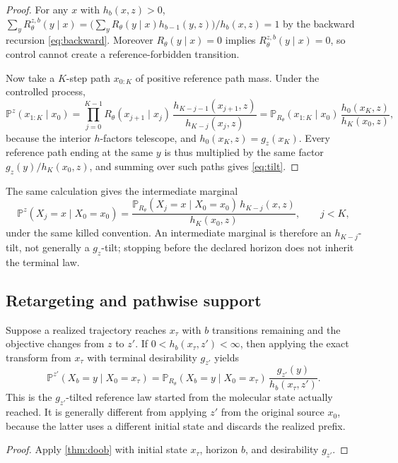 \begin{proof}
For any $x$ with $h_b(x,z)>0$, $\sum_y R^{z,b}_\theta(y\mid x)=\bigl(\sum_y R_\theta(y\mid x)h_{b-1}(y,z)\bigr)/h_b(x,z)=1$ by the backward recursion \eqref{eq:backward}. Moreover $R_\theta(y\mid x)=0$ implies $R^{z,b}_\theta(y\mid x)=0$, so control cannot create a reference-forbidden transition.

Now take a $K$-step path $x_{0:K}$ of positive reference path mass. Under the controlled process,
\[
\mathbb P^{z}(x_{1:K}\mid x_0)
=\prod_{j=0}^{K-1} R_\theta(x_{j+1}\mid x_j)\,
\frac{h_{K-j-1}(x_{j+1},z)}{h_{K-j}(x_j,z)}
=\mathbb P_{R_\theta}(x_{1:K}\mid x_0)\,\frac{h_0(x_K,z)}{h_K(x_0,z)},
\]
because the interior $h$-factors telescope, and $h_0(x_K,z)=g_z(x_K)$. Every reference path ending at the same $y$ is thus multiplied by the same factor $g_z(y)/h_K(x_0,z)$, and summing over such paths gives \eqref{eq:tilt}.
\end{proof}

The same calculation gives the intermediate marginal
\[
\mathbb P^{z}(X_j=x\mid X_0=x_0)
=\frac{\mathbb P_{R_\theta}(X_j=x\mid X_0=x_0)\,h_{K-j}(x,z)}{h_K(x_0,z)},
\qquad j<K,
\]
under the same killed convention. An intermediate marginal is therefore an $h_{K-j}$-tilt, not generally a $g_z$-tilt; stopping before the declared horizon does not inherit the terminal law.

\subsection{Retargeting and pathwise support}
\label{app:retarget-proof}

\begin{corollary}
\label{cor:retarget-proof}
Suppose a realized trajectory reaches $x_\tau$ with $b$ transitions remaining and the objective changes from $z$ to $z'$. If $0<h_b(x_\tau,z')<\infty$, then applying the exact transform from $x_\tau$ with terminal desirability $g_{z'}$ yields
\[
\mathbb P^{z'}(X_b=y\mid X_0=x_\tau)
=\mathbb P_{R_\theta}(X_b=y\mid X_0=x_\tau)\,\frac{g_{z'}(y)}{h_b(x_\tau,z')}.
\]
This is the $g_{z'}$-tilted reference law started from the molecular state actually reached. It is generally different from applying $z'$ from the original source $x_0$, because the latter uses a different initial state and discards the realized prefix.
\end{corollary}

\begin{proof}
Apply \cref{thm:doob} with initial state $x_\tau$, horizon $b$, and desirability $g_{z'}$.
\end{proof}

